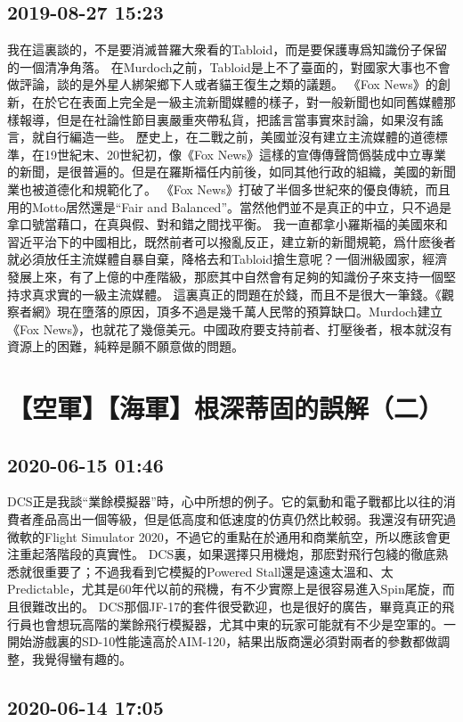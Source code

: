 \documentclass[twocolumn]{ctexart}
\begin{document}
\subsection*{2019-08-27 15:23}

我在這裏談的，不是要消滅普羅大衆看的Tabloid，而是要保護專爲知識份子保留的一個清净角落。 
在Murdoch之前，Tabloid是上不了臺面的，對國家大事也不會做評論，談的是外星人綁架鄉下人或者貓王復生之類的議題。 
《Fox News》的創新，在於它在表面上完全是一級主流新聞媒體的樣子，對一般新聞也如同舊媒體那樣報導，但是在社論性節目裏嚴重夾帶私貨，把謠言當事實來討論，如果沒有謠言，就自行編造一些。 
歷史上，在二戰之前，美國並沒有建立主流媒體的道德標準，在19世紀末、20世紀初，像《Fox News》這樣的宣傳傳聲筒僞裝成中立專業的新聞，是很普遍的。但是在羅斯福任内前後，如同其他行政的組織，美國的新聞業也被道德化和規範化了。 
《Fox News》打破了半個多世紀來的優良傳統，而且用的Motto居然還是“Fair and Balanced”。當然他們並不是真正的中立，只不過是拿口號當藉口，在真與假、對和錯之間找平衡。 
我一直都拿小羅斯福的美國來和習近平治下的中國相比，既然前者可以撥亂反正，建立新的新聞規範，爲什麽後者就必須放任主流媒體自暴自棄，降格去和Tabloid搶生意呢？一個洲級國家，經濟發展上來，有了上億的中產階級，那麽其中自然會有足夠的知識份子來支持一個堅持求真求實的一級主流媒體。 
這裏真正的問題在於錢，而且不是很大一筆錢。《觀察者網》現在墮落的原因，頂多不過是幾千萬人民幣的預算缺口。Murdoch建立《Fox News》，也就花了幾億美元。中國政府要支持前者、打壓後者，根本就沒有資源上的困難，純粹是願不願意做的問題。
\section*{【空軍】【海軍】根深蒂固的誤解（二）}
\subsection*{2020-06-15 01:46}

DCS正是我談“業餘模擬器”時，心中所想的例子。它的氣動和電子戰都比以往的消費者產品高出一個等級，但是低高度和低速度的仿真仍然比較弱。我還沒有研究過微軟的Flight Simulator 2020，不過它的重點在於通用和商業航空，所以應該會更注重起落階段的真實性。
DCS裏，如果選擇只用機炮，那麽對飛行包綫的徹底熟悉就很重要了；不過我看到它模擬的Powered Stall還是遠遠太溫和、太Predictable，尤其是60年代以前的飛機，有不少實際上是很容易進入Spin尾旋，而且很難改出的。
DCS那個JF-17的套件很受歡迎，也是很好的廣告，畢竟真正的飛行員也會想玩高階的業餘飛行模擬器，尤其中東的玩家可能就有不少是空軍的。一開始游戲裏的SD-10性能遠高於AIM-120，結果出版商還必須對兩者的參數都做調整，我覺得蠻有趣的。
\subsection*{2020-06-14 17:05}
\end{document}
